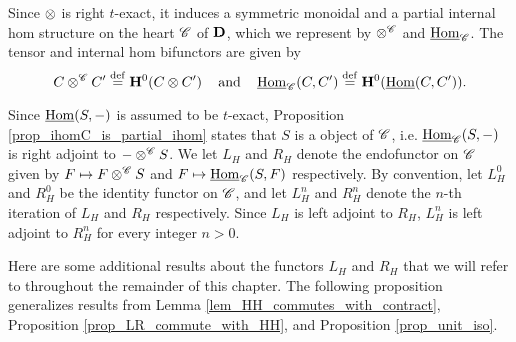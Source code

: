 Since $\otimes$ is right $t$-exact, it induces a symmetric 
monoidal and a partial internal hom structure on the heart 
$\mathscr{C}$ of $\mathbf{D}$, which we represent by $\otimes^{\mathscr{C}}$ 
and $\underline{\mathrm{Hom}}_{\mathscr{C}}$. The tensor and internal hom bifunctors
are given by
\[
C \otimes^{\mathscr{C}} C' \stackrel{\mathrm{def}}{=} \mathbf{H}^0(C \otimes C') 
   \;\;\;\textrm{ and }\;\;\;
\underline{\mathrm{Hom}}_{\mathscr{C}}(C, C') \stackrel{\mathrm{def}}{=} \mathbf{H}^0(\underline{\mathrm{Hom}}(C, C')).
\]

Since $\underline{\mathrm{Hom}}(S, -)$ is assumed to be $t$-exact, Proposition 
\ref{prop_ihomC_is_partial_ihom} states that $S$ is a \SemiInvertible
object of $\mathscr{C}$, i.e. $\underline{\mathrm{Hom}}_{\mathscr{C}}(S, -)$ is right
adjoint to $- \otimes^{\mathscr{C}} S$. We let $L_H$ and $R_H$ denote 
the endofunctor on $\mathscr{C}$ given by $F \mapsto F 
\otimes^{\mathscr{C}} S$ and $F \mapsto \underline{\mathrm{Hom}}_{\mathscr{C}}(S, F)$ 
respectively. By convention, let $L_H^0$ and $R_H^0$ be the 
identity functor on $\mathscr{C}$, and let $L_H^n$ and $R_H^n$ denote 
the $n$-th iteration of $L_H$ and $R_H$ respectively. Since $L_H$ 
is left adjoint to $R_H$, $L_H^n$ is left adjoint to $R_H^n$ for
every integer $n > 0$.

Here are some additional results about the functors $L_H$ and 
$R_H$ that we will refer to throughout the remainder of this 
chapter. The following proposition generalizes results from
Lemma \ref{lem_HH_commutes_with_contract}, Proposition 
\ref{prop_LR_commute_with_HH}, and Proposition 
\ref{prop_unit_iso}.

